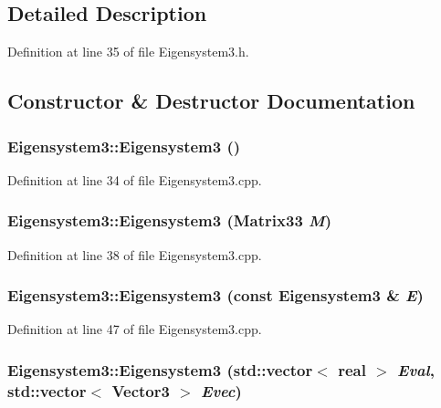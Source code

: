 \subsection{Detailed Description}


Definition at line 35 of file Eigensystem3.h.



\subsection{Constructor \& Destructor Documentation}
\subsubsection[{Eigensystem3}]{\setlength{\rightskip}{0pt plus 5cm}Eigensystem3::Eigensystem3 ()}\label{classEigensystem3_a31ab53ba1ff2c9d3e03d14775954b770}


Definition at line 34 of file Eigensystem3.cpp.

\subsubsection[{Eigensystem3}]{\setlength{\rightskip}{0pt plus 5cm}Eigensystem3::Eigensystem3 ({\bf Matrix33} {\em M})}\label{classEigensystem3_a94eb6dfdeee381ed3992e5dbb21320d3}


Definition at line 38 of file Eigensystem3.cpp.

\subsubsection[{Eigensystem3}]{\setlength{\rightskip}{0pt plus 5cm}Eigensystem3::Eigensystem3 (const {\bf Eigensystem3} \& {\em E})}\label{classEigensystem3_ae70fe46879986f1116a9388c44195d8c}


Definition at line 47 of file Eigensystem3.cpp.

\subsubsection[{Eigensystem3}]{\setlength{\rightskip}{0pt plus 5cm}Eigensystem3::Eigensystem3 (std::vector$<$ {\bf real} $>$ {\em Eval}, \/  std::vector$<$ {\bf Vector3} $>$ {\em Evec})}\label{classEigensystem3_ac8b891bd1c9a91f970fbec6ee984f26a}


